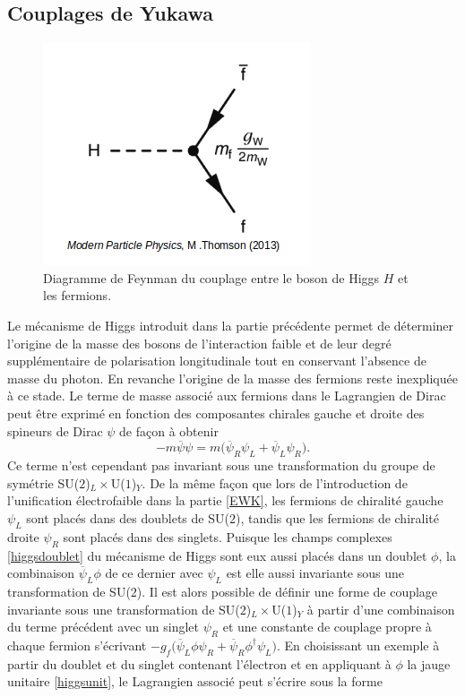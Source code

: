         \subsection{Couplages de Yukawa}
        \label{yukawa}

        \begin{figure}
        \centering
            \includegraphics[scale=0.45]{Chapitre2/Images/higgsfcoupling.png} 
            \caption{Diagramme de Feynman du couplage entre le boson de Higgs $H$ et les fermions.}
        \label{higgsfcoupling}
        \end{figure}

        Le mécanisme de Higgs introduit dans la partie précédente permet de déterminer l'origine de la masse des bosons de l'interaction faible et de leur degré supplémentaire de polarisation longitudinale tout en conservant l'absence de masse du photon. En revanche l'origine de la masse des fermions reste inexpliquée à ce stade. Le terme de masse associé aux fermions dans le Lagrangien de Dirac peut être exprimé en fonction des composantes chirales gauche et droite des spineurs de Dirac $\psi$ de façon à obtenir $$-m\overline{\psi}\psi=m\bigl(\overline{\psi}_R\psi_L+\overline{\psi}_L\psi_R\bigr).$$ Ce terme n'est cependant pas invariant sous une transformation du groupe de symétrie SU($2$)$_L\times$U($1$)$_Y$. De la même façon que lors de l'introduction de l'unification électrofaible dans la partie \ref{EWK}, les fermions de chiralité gauche $\psi_L$ sont placés dans des doublets de SU($2$), tandis que les fermions de chiralité droite $\psi_R$ sont placés dans des singlets. Puisque les champs complexes \ref{higgsdoublet} du mécanisme de Higgs sont eux aussi placés dans un doublet $\phi$, la combinaison $\overline{\psi}_L\phi$ de ce dernier avec $\psi_L$ est elle aussi invariante sous une transformation de SU($2$). Il est alors possible de définir une forme de couplage invariante sous une transformation de SU($2$)$_L\times$U($1$)$_Y$ à partir d'une combinaison du terme précédent avec un singlet $\psi_R$ et une constante de couplage propre à chaque fermion s'écrivant $-g_f\bigl(\overline{\psi}_L\phi\psi_R+\overline{\psi}_R\phi^{\dag}\psi_L\bigr)$. En choisissant un exemple à partir du doublet et du singlet contenant l'électron et en appliquant à $\phi$ la jauge unitaire \ref{higgsunit}, le Lagrangien associé peut s'écrire sous la forme

